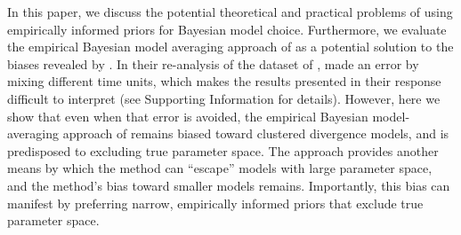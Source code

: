 In this paper, we discuss the potential theoretical and practical problems of
using empirically informed priors for Bayesian model choice.
Furthermore, we evaluate the empirical Bayesian model averaging approach of
\citet{Hickerson2013} as a potential solution to the biases revealed by
\citet{Oaks2012}.
In their re-analysis of the dataset of \citet{Oaks2012}, \citet{Hickerson2013}
made an error by mixing different time units, which makes the results presented
in their response difficult to interpret (see Supporting Information for
details).
However, here we show that even when that error is avoided, the empirical
Bayesian model-averaging approach of \citet{Hickerson2013} remains biased
toward clustered divergence models, and is predisposed to excluding true
parameter space.
The approach provides another means by which the method can ``escape'' models
with large parameter space, and the method's bias toward smaller models
remains.
Importantly, this bias can manifest by preferring narrow, empirically informed
priors that exclude true parameter space.







